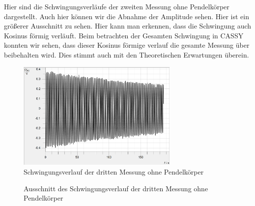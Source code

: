 \documentclass[twoside]{protokoll}
\begin{document}
Hier sind die Schwingungsverläufe der zweiten Messung ohne Pendelkörper dargestellt. 
Auch hier können wir die Abnahme der Amplitude sehen.
Hier ist ein größerer Ausschnitt zu sehen. Hier kann man erkennen, dass die Schwingung auch Kosinus förmig verläuft. 
Beim betrachten der Gesamten Schwingung in CASSY konnten wir sehen, dass dieser Kosinus förmige verlauf die gesamte Messung über beibehalten wird.
Dies stimmt auch mit den Theoretischen Erwartungen überein.

\begin{figure}[H]
    \centering
    \includegraphics[width=0.7\textwidth]{plots/stange-3-komplett.pdf}
    \caption{Schwingungsverlauf der dritten Messung ohne Pendelkörper}
\end{figure}
\begin{figure}[H]
    \centering
    \hfill
    \caption{Ausschnitt des Schwingungsverlauf der dritten Messung ohne Pendelkörper}
\end{figure}
\end{document}
